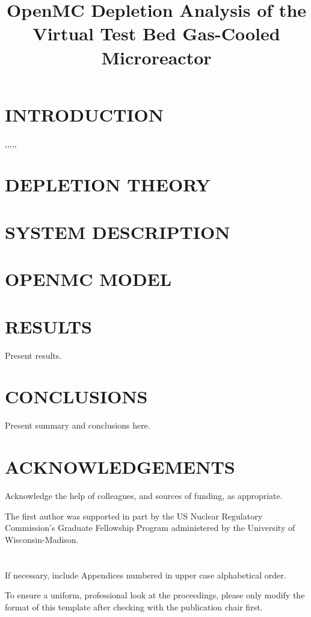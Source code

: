\documentclass[letterpaper]{physor2024}
\title{OpenMC Depletion Analysis of the Virtual Test Bed Gas-Cooled Microreactor}
\begin{document}
\section{INTRODUCTION}\label{sec:intro}
\cite{website},\cite{book},\cite{conf_paper},\cite{journal},\cite{report},\cite{proc_paper}

\section{DEPLETION THEORY}\label{sec:depletion}

\section{SYSTEM DESCRIPTION}\label{sec:system}

\section{OPENMC MODEL}\label{sec:openmc_model}

\section{RESULTS}\label{sec:results}
Present results.

\section{CONCLUSIONS}\label{sec:conclusions}
Present summary and conclusions here.

\section*{ACKNOWLEDGEMENTS}
Acknowledge the help of colleagues, and sources of funding, as appropriate.

The first author was supported in part by the US Nuclear Regulatory Commission's Graduate Fellowship Program administered by the University of Wisconsin-Madison.

\printglossaries




\appendix

\section{}
If necessary, include Appendices numbered in upper case alphabetical order.

To ensure a uniform, professional look at the proceedings, please only modify the format of this template after checking with the publication chair first.
\end{document}
